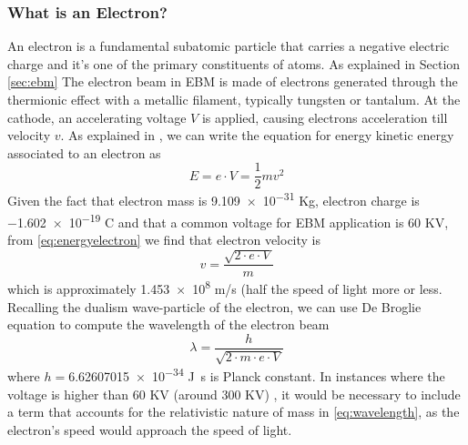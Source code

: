 \subsubsection{What is an Electron?}
\label{sssec:electron}
An electron is a fundamental subatomic particle that carries a negative electric charge and it's one of the primary constituents of atoms. As explained in Section \ref{sec:ebm} The electron beam in EBM is made of electrons generated through the thermionic effect with a metallic filament, typically tungsten or tantalum. At the cathode, an accelerating voltage $V$ is applied, causing electrons acceleration till velocity $v$. As explained in \cite{krumeich_properties_nodate}, we can write the equation for energy kinetic energy associated to an electron as 
\begin{equation}
    \label{eq:energyelectron}
    E  = e\cdot V = \frac{1}{2}mv^2
\end{equation}
Given the fact that electron mass is \num{9.109e-31} \unit{Kg}, electron charge is \num{-1.602e-19} \unit{C} and that a common voltage for EBM application is \num{60} \unit{KV}, from \ref{eq:energyelectron} we find that electron velocity is
\begin{equation}
\label{eq:velocityelectron}
v=\frac{\sqrt{2\cdot e\cdot V}}{m}
\end{equation}
which is approximately \num{1.453e8} \unit{m/s} (half the speed of light more or less. Recalling the dualism wave-particle of the electron, we can use De Broglie equation \cite{krumeich_properties_nodate} to compute the wavelength of the electron beam
\begin{equation}
\label{eq:wavelength}
    \lambda = \frac{h}{\sqrt{2\cdot m \cdot e \cdot V}}
\end{equation}
where $h=$\num{6.62607015e-34} \unit{J.s} is Planck constant. In instances where the voltage is higher than \num{60} \unit{KV} (around \num{300} \unit{KV}) , it would be necessary to include a term that accounts for the relativistic nature of mass in \ref{eq:wavelength}, as the electron's speed would approach the speed of light.


